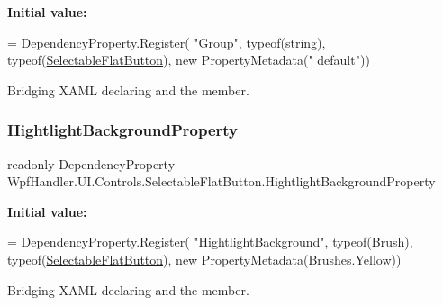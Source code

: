 {\bfseries Initial value\+:}
\begin{DoxyCode}
= DependencyProperty.Register(
          \textcolor{stringliteral}{"Group"}, typeof(\textcolor{keywordtype}{string}), typeof(\mbox{\hyperlink{class_wpf_handler_1_1_u_i_1_1_controls_1_1_selectable_flat_button_a05bd4f4c7754212984b77499922a275d}{SelectableFlatButton}}), \textcolor{keyword}{new} PropertyMetadata(\textcolor{stringliteral}{"
      default"}))
\end{DoxyCode}


Bridging X\+A\+ML declaring and the member. 

\mbox{\label{class_wpf_handler_1_1_u_i_1_1_controls_1_1_selectable_flat_button_afc8f06c4a5fab3f5d259a250910ace6e}} 
\subsubsection{\texorpdfstring{Hightlight\+Background\+Property}{HightlightBackgroundProperty}}
{\footnotesize\ttfamily readonly Dependency\+Property Wpf\+Handler.\+U\+I.\+Controls.\+Selectable\+Flat\+Button.\+Hightlight\+Background\+Property\hspace{0.3cm}{\ttfamily [static]}}

{\bfseries Initial value\+:}
\begin{DoxyCode}
= DependencyProperty.Register(
          \textcolor{stringliteral}{"HightlightBackground"}, typeof(Brush), typeof(\mbox{\hyperlink{class_wpf_handler_1_1_u_i_1_1_controls_1_1_selectable_flat_button_a05bd4f4c7754212984b77499922a275d}{SelectableFlatButton}}),
          \textcolor{keyword}{new} PropertyMetadata(Brushes.Yellow))
\end{DoxyCode}


Bridging X\+A\+ML declaring and the member. 

\mbox{\label{class_wpf_handler_1_1_u_i_1_1_controls_1_1_selectable_flat_button_afecdba1a6a477d574f423cc47ded74f7}} 
